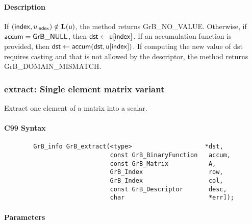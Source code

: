\paragraph{Description}

If $({\sf index},u_{\sf index}) \notin \bold{L}({\sf u})$, the method returns {\sf GrB\_NO\_VALUE}.
Otherwise, if ${\sf accum} = {\sf GrB\_NULL}$, then ${\sf dst} \leftarrow {\sf u}[{\sf index}]$.
If an accumulation function is provided, then ${\sf dst} \leftarrow {\sf accum}({\sf dst},{\sf u}[{\sf index}])$.
If computing the new value of {\sf dst} requires casting and that is not allowed by the descriptor,
the method returns {\sf GrB\_DOMAIN\_MISMATCH}.


\subsubsection{{\sf extract}: Single element matrix variant}
\label{Sec:extract_single_element_mat}

Extract one element of a matrix into a scalar. 

\paragraph{C99 Syntax}

\begin{verbatim}
        GrB_info GrB_extract(<type>                    *dst,
                             const GrB_BinaryFunction   accum,
                             const GrB_Matrix           A,
                             GrB_Index                  row,
                             GrB_Index                  col,
                             const GrB_Descriptor       desc,
                             char                       *err]); 

\end{verbatim}

\paragraph{Parameters}

